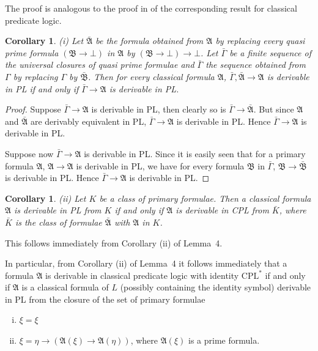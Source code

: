 \documentclass[12pt,a4paper]{article}
\newtheorem{corollary}[lemma]{Corollary}
\begin{document}
The proof is analogous to the proof in \cite[§3]{Schuttif1950} of the
corresponding result for classical predicate logic.

\begin{corollary}
(i) Let $\bar{\mathfrak{A}}$ be the formula obtained from $\mathfrak{A}$ by
replacing every quasi prime formula $(\mathfrak{B} \to \bot)$ in $\mathfrak{A}$
by $(\mathfrak{B} \to \bot) \to \bot$. Let $\bar{\Gamma}$ be a finite
sequence of the universal closures of quasi prime formulae and $\bar{\Gamma}$
the sequence obtained from $\Gamma$ by replacing $\Gamma$ by $\bar{\mathfrak{B}}$.
Then for every classical formula $\mathfrak{A}$, $\bar{\Gamma}, \bar{\mathfrak{A}} \to \mathfrak{A}$
is derivable in PL if and only if $\bar{\Gamma} \to \mathfrak{A}$ is derivable
in PL.
\end{corollary}

\begin{proof}
Suppose $\bar{\Gamma} \to \mathfrak{A}$ is derivable in PL, then clearly so
is $\bar{\Gamma} \to \bar{\mathfrak{A}}$. But since $\mathfrak{A}$ and
$\bar{\mathfrak{A}}$ are derivably equivalent in PL, $\bar{\Gamma} \to
\mathfrak{A}$ is derivable in PL. Hence $\bar{\Gamma} \to \mathfrak{A}$ is
derivable in PL.

Suppose now $\bar{\Gamma} \to \mathfrak{A}$ is derivable in PL. Since it is
easily seen that for a primary formula $\mathfrak{A}$, $\mathfrak{A} \to
\mathfrak{A}$ is derivable in PL, we have for every formula $\mathfrak{B}$ in
$\bar{\Gamma}$, $\mathfrak{B} \to \bar{\mathfrak{B}}$ is derivable in PL.
Hence $\bar{\Gamma} \to \mathfrak{A}$ is derivable in PL.
\end{proof}

\begin{corollary}
(ii) Let $K$ be a class of primary formulae. Then a classical formula
$\mathfrak{A}$ is derivable in PL from $K$ if and only if $\mathfrak{A}$
is derivable in CPL from $\bar{K}$, where $\bar{K}$ is the class of formulae
$\bar{\mathfrak{A}}$ with $\mathfrak{A}$ in $K$.
\end{corollary}

This follows immediately from Corollary (ii) of Lemma~4.

In particular, from Corollary (ii) of Lemma~4 it follows immediately that a
formula $\mathfrak{A}$ is derivable in classical predicate logic with identity
$\mathrm{CPL}^*$ if and only if $\mathfrak{A}$ is a classical formula of $L$
(possibly containing the identity symbol) derivable in PL from the closure of
the set of primary formulae
\begin{enumerate}[(i)]
\item $\xi = \xi$
\item $\xi = \eta \to (\mathfrak{A}(\xi) \to \mathfrak{A}(\eta))$, where
  $\mathfrak{A}(\xi)$ is a prime formula.
\end{enumerate}
\end{document}
